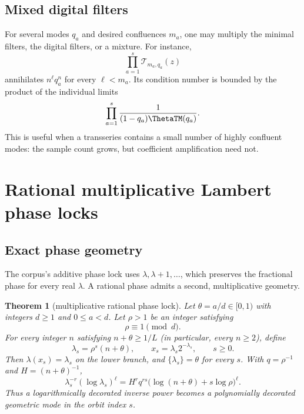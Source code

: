 \documentclass[11pt]{article}
\numberwithin{equation}{section}
\newtheorem{theorem}{Theorem}[section]
\theoremstyle{definition}
\theoremstyle{remark}
\begin{document}
\subsection{Mixed digital filters}

For several modes $q_a$ and desired confluences $m_a$, one may multiply the minimal
filters, the digital filters, or a mixture.  For instance,
\begin{equation}
 \prod_{a=1}^{s}\mathcal T_{m_a,q_a}(z)
 \label{p6:eq:mixed-digital-filter}
\end{equation}
annihilates $n^\ell q_a^n$ for every $\ell<m_a$.  Its condition number is bounded by the
product of the individual limits
\[
 \prod_{a=1}^{s}\frac{1}{(1-q_a)\ThetaTM(q_a)}.
\]
This is useful when a transseries contains a small number of highly confluent modes: the
sample count grows, but coefficient amplification need not.

\section{Rational multiplicative Lambert phase locks}
\label{p6:sec:phase-lock}

\subsection{Exact phase geometry}

The corpus's additive phase lock uses $\lambda,\lambda+1,\ldots$, which preserves the
fractional phase for every real $\lambda$.  A rational phase admits a second, multiplicative
geometry.

\begin{theorem}[multiplicative rational phase lock]
\label{p6:thm:multiplicative-lock}
Let $\theta=a/d\in[0,1)$ with integers $d\ge1$ and $0\le a<d$.  Let $\rho>1$ be an
integer satisfying
\begin{equation}
 \rho\equiv1\pmod d.
 \label{p6:eq:rho-congruence}
\end{equation}
For every integer $n$ satisfying $n+\theta\ge1/L$ (in particular, every $n\ge2$), define
\begin{equation}
 \lambda_s=\rho^s(n+\theta),
 \qquad
 x_s=\lambda_s2^{-\lambda_s},
 \qquad s\ge0.
 \label{p6:eq:multiplicative-lambda-orbit}
\end{equation}
Then $\lambda(x_s)=\lambda_s$ on the lower branch, and
$\{\lambda_s\}=\theta$ for every $s$.  With $q=\rho^{-1}$ and
$H=(n+\theta)^{-1}$,
\begin{equation}
 \lambda_s^{-r}(\log\lambda_s)^\ell
 =H^rq^{rs}\bigl(\log(n+\theta)+s\log\rho\bigr)^\ell.
 \label{p6:eq:decorated-mode-orbit}
\end{equation}
Thus a logarithmically decorated inverse power becomes a polynomially decorated geometric
mode in the orbit index $s$.
\end{theorem}
\end{document}
